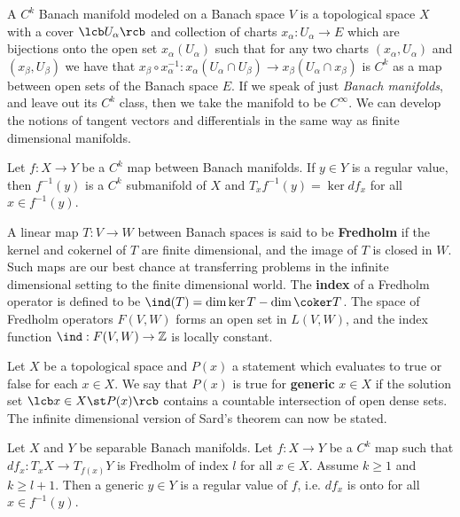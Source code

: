 A $C^k$ Banach manifold modeled on a Banach space $V$ is a topological space $X$ with a cover $\lcb U_\alpha \rcb$ and collection of charts $x_\alpha : U_\alpha \rightarrow E$ which are bijections onto the open set $x_{\alpha}(U_\alpha)$ such that for any two charts $(x_\alpha,U_\alpha)$ and $(x_\beta,U_\beta)$ we have that $x_\beta \circ x_{\alpha}^{-1} : x_{\alpha}(U_\alpha \cap U_\beta) \rightarrow x_\beta(U_\alpha \cap x_\beta)$ is $C^k$ as a map between open sets of the Banach space $E$. If we speak of just \emph{Banach manifolds}, and leave out its $C^k$ class, then we take the manifold to be $C^\infty$. We can develop the notions of tangent vectors and differentials in the same way as finite dimensional manifolds.

\begin{thm}
Let $f : X \rightarrow Y$ be a $C^k$ map between Banach manifolds. If $y \in Y$ is a regular value, then $f^{-1}(y)$ is a $C^k$ submanifold of $X$ and $T_x f^{-1}(y) = \ker df_x$ for all $x \in f^{-1}(y)$.
\end{thm}

A linear map $T : V \rightarrow W$ between Banach spaces is said to be \textbf{Fredholm} if the kernel and cokernel of $T$ are finite dimensional, and the image of $T$ is closed in $W$. Such maps are our best chance at transferring problems in the infinite dimensional setting to the finite dimensional world. The \textbf{index} of a Fredholm operator is defined to be $\ind(T) = \dim\ker T - \dim\coker T$. The space of Fredholm operators $F(V,W)$ forms an open set in $L(V,W)$, and the index function $\ind : F(V,W) \rightarrow \mathbb Z$ is locally constant.

Let $X$ be a topological space and $P(x)$ a statement which evaluates to true or false for each $x \in X$. We say that $P(x)$ is true for \textbf{generic} $x \in X$ if the solution set $\lcb x \in X \st P(x) \rcb$ contains a countable intersection of open dense sets. The infinite dimensional version of Sard's theorem can now be stated.
\begin{thm}
Let $X$ and $Y$ be separable Banach manifolds. Let $f : X \rightarrow Y$ be a $C^k$ map such that $df_x : T_x X \rightarrow T_{f(x)} Y$ is Fredholm of index $l$ for all $x \in X$. Assume $k \geq 1$ and $k \geq l+1$. Then a generic $y \in Y$ is a regular value of $f$, i.e. $df_x$ is onto for all $x \in f^{-1}(y)$.
\end{thm}

